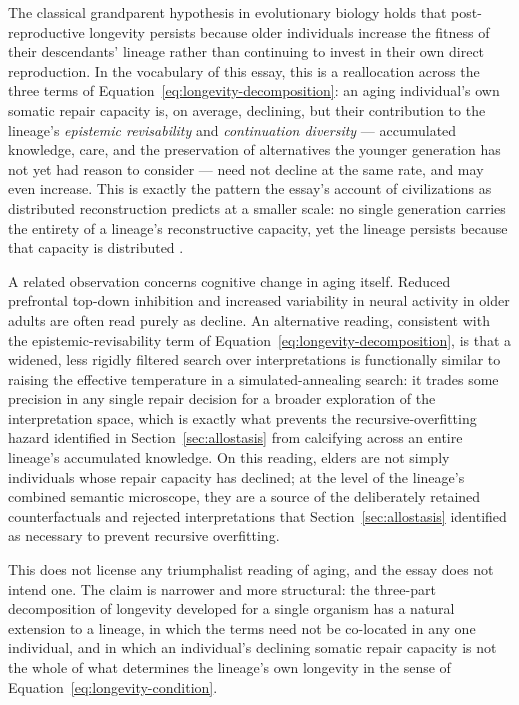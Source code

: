 \documentclass[12pt]{article}
\begin{document}
The classical grandparent hypothesis in evolutionary biology holds that post-reproductive longevity persists because older individuals increase the fitness of their descendants' lineage rather than continuing to invest in their own direct reproduction. In the vocabulary of this essay, this is a reallocation across the three terms of Equation~\eqref{eq:longevity-decomposition}: an aging individual's own somatic repair capacity is, on average, declining, but their contribution to the lineage's \emph{epistemic revisability} and \emph{continuation diversity} --- accumulated knowledge, care, and the preservation of alternatives the younger generation has not yet had reason to consider --- need not decline at the same rate, and may even increase. This is exactly the pattern the essay's account of civilizations as distributed reconstruction predicts at a smaller scale: no single generation carries the entirety of a lineage's reconstructive capacity, yet the lineage persists because that capacity is distributed \cite{flyxion2026persistence}.

A related observation concerns cognitive change in aging itself. Reduced prefrontal top-down inhibition and increased variability in neural activity in older adults are often read purely as decline. An alternative reading, consistent with the epistemic-revisability term of Equation~\eqref{eq:longevity-decomposition}, is that a widened, less rigidly filtered search over interpretations is functionally similar to raising the effective temperature in a simulated-annealing search: it trades some precision in any single repair decision for a broader exploration of the interpretation space, which is exactly what prevents the recursive-overfitting hazard identified in Section~\ref{sec:allostasis} from calcifying across an entire lineage's accumulated knowledge. On this reading, elders are not simply individuals whose repair capacity has declined; at the level of the lineage's combined semantic microscope, they are a source of the deliberately retained counterfactuals and rejected interpretations that Section~\ref{sec:allostasis} identified as necessary to prevent recursive overfitting.

This does not license any triumphalist reading of aging, and the essay does not intend one. The claim is narrower and more structural: the three-part decomposition of longevity developed for a single organism has a natural extension to a lineage, in which the terms need not be co-located in any one individual, and in which an individual's declining somatic repair capacity is not the whole of what determines the lineage's own longevity in the sense of Equation~\eqref{eq:longevity-condition}.
\end{document}

